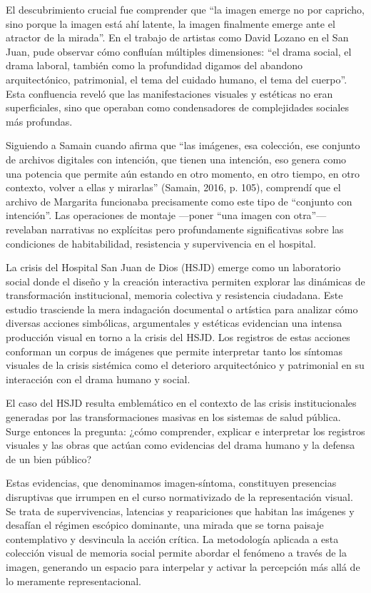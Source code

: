 \textcolor{edit30sept}{El descubrimiento crucial fue comprender que “la imagen emerge no por capricho, sino porque la imagen está ahí latente, la imagen finalmente emerge ante el atractor de la mirada”. En el trabajo de artistas como David Lozano en el San Juan, pude observar cómo confluían múltiples dimensiones: “el drama social, el drama laboral, también como la profundidad digamos del abandono arquitectónico, patrimonial, el tema del cuidado humano, el tema del cuerpo”. Esta confluencia reveló que las manifestaciones visuales y estéticas no eran superficiales, sino que operaban como condensadores de complejidades sociales más profundas.}

\textcolor{edit30sept}{Siguiendo a Samain cuando afirma que “las imágenes, esa colección, ese conjunto de archivos digitales con intención, que tienen una intención, eso genera como una potencia que permite aún estando en otro momento, en otro tiempo, en otro contexto, volver a ellas y mirarlas” (Samain, 2016, p. 105), comprendí que el archivo de Margarita funcionaba precisamente como este tipo de “conjunto con intención”. Las operaciones de montaje —poner “una imagen con otra”— revelaban narrativas no explícitas pero profundamente significativas sobre las condiciones de habitabilidad, resistencia y supervivencia en el hospital.}

La crisis del Hospital San Juan de Dios (HSJD) emerge como un laboratorio social donde el diseño y la creación interactiva permiten explorar las dinámicas de transformación institucional, memoria colectiva y resistencia ciudadana. Este estudio trasciende la mera indagación documental o artística para analizar cómo diversas acciones simbólicas, argumentales y estéticas evidencian una intensa producción visual en torno a la crisis del HSJD. Los registros de estas acciones conforman un corpus de imágenes que permite interpretar tanto los síntomas visuales de la crisis sistémica como el deterioro arquitectónico y patrimonial en su interacción con el drama humano y social.

El caso del HSJD resulta emblemático en el contexto de las crisis institucionales generadas por las transformaciones masivas en los sistemas de salud pública. Surge entonces la pregunta: ¿cómo comprender, explicar e interpretar los registros visuales y las obras que actúan como evidencias del drama humano y la defensa de un bien público?

\textcolor{edit30sept}{Estas evidencias, que denominamos imagen-síntoma, constituyen presencias disruptivas que irrumpen en el curso \textcolor{edit30sept}{normativizado} de la representación visual. Se trata de supervivencias, latencias y reapariciones que habitan las imágenes y desafían el régimen escópico dominante, una mirada que se torna paisaje contemplativo y desvincula la acción crítica. La metodología aplicada a esta colección visual de memoria social permite abordar el fenómeno a través de la imagen, generando un espacio para interpelar y activar la percepción más allá de lo meramente representacional.}

